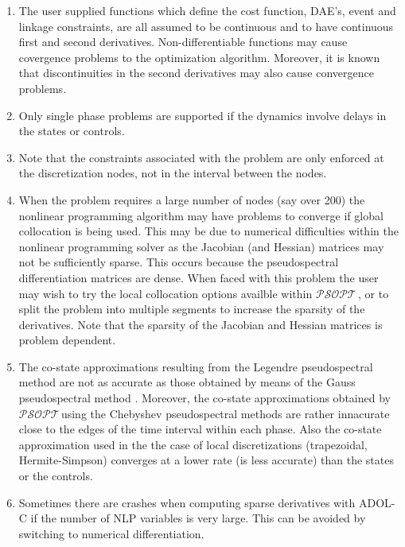 \documentclass[a4paper,11pt]{report}    %
\newcommand{\psopt}{$\mathcal{PSOPT}$\,}  %
\begin{document}
\begin{enumerate}
\item The user supplied functions which define the cost function, DAE's, event and linkage constraints, 
are all assumed to be continuous and to have continuous first and second derivatives. Non-differentiable functions
may cause covergence problems to the optimization
algorithm. Moreover, it is known that discontinuities in the second derivatives may also cause convergence problems.

\item Only single phase problems are supported if the dynamics involve delays in the states or controls.

\item Note that the constraints associated with the problem are only enforced at the discretization nodes, not in the interval 
between the nodes.

\item When the problem requires a large number of nodes (say over 200) the nonlinear programming algorithm may have
problems to converge if global collocation is being used.  This may be due to numerical difficulties within the nonlinear
programming solver as the Jacobian (and Hessian) matrices may not be sufficiently sparse. This occurs because the 
pseudospectral differentiation matrices are dense.  When faced with this problem the user may wish to try the local
collocation options availble within \psopt, or to split the problem into multiple segments to increase the sparsity
of the derivatives.  Note that the sparsity of the Jacobian and Hessian
matrices is problem dependent.

\item The co-state approximations resulting from the Legendre pseudospectral method are not as accurate as 
those obtained by means of the Gauss pseudospectral method \cite{Benson:04}. Moreover, the co-state approximations
obtained by \psopt using the Chebyshev pseudospectral methods are rather innacurate close to the edges of the time interval within
each phase. Also the co-state approximation used in the the case of local discretizations (trapezoidal, Hermite-Simpson) 
converges at a lower rate (is less accurate) than the states or the controls.

\item Sometimes there are crashes when computing sparse derivatives with ADOL-C if the number of NLP variables is very large.
This can be avoided by switching to numerical differentiation.
\end{enumerate}
\end{document}
